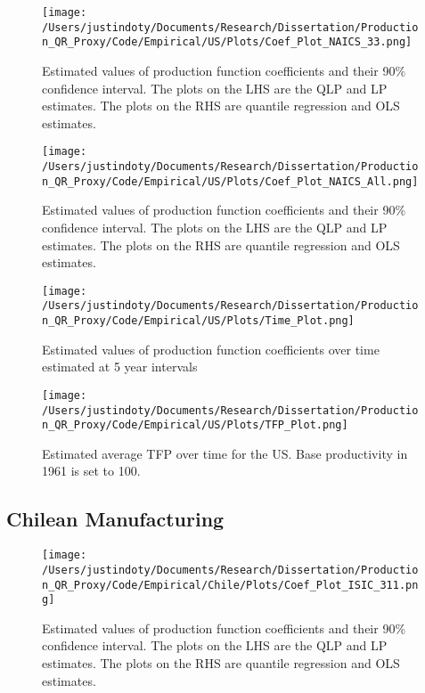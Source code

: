 \documentclass[11pt]{article}
\begin{document}
\begin{figure}[H]
\centering
\texttt{[image: /Users/justindoty/Documents/Research/Dissertation/Production\_QR\_Proxy/Code/Empirical/US/Plots/Coef\_Plot\_NAICS\_33.png]}
\caption{Estimated values of production function coefficients and their 90\% confidence interval. The plots on the LHS are the QLP and LP estimates. The plots on the RHS are quantile regression and OLS estimates.}
\end{figure}

\begin{figure}[H]
\centering
\texttt{[image: /Users/justindoty/Documents/Research/Dissertation/Production\_QR\_Proxy/Code/Empirical/US/Plots/Coef\_Plot\_NAICS\_All.png]}
\caption{Estimated values of production function coefficients and their 90\% confidence interval. The plots on the LHS are the QLP and LP estimates. The plots on the RHS are quantile regression and OLS estimates.}
\end{figure}

\begin{figure}[H]
\centering
\texttt{[image: /Users/justindoty/Documents/Research/Dissertation/Production\_QR\_Proxy/Code/Empirical/US/Plots/Time\_Plot.png]}
\caption{Estimated values of production function coefficients over time estimated at 5 year intervals}
\end{figure}

\begin{figure}[H]
\centering
\texttt{[image: /Users/justindoty/Documents/Research/Dissertation/Production\_QR\_Proxy/Code/Empirical/US/Plots/TFP\_Plot.png]}
\caption{Estimated average TFP over time for the US. Base productivity in 1961 is set to 100.}
\end{figure}


\subsection{Chilean Manufacturing}




\begin{figure}[H]
\centering
\texttt{[image: /Users/justindoty/Documents/Research/Dissertation/Production\_QR\_Proxy/Code/Empirical/Chile/Plots/Coef\_Plot\_ISIC\_311.png]}
\caption{Estimated values of production function coefficients and their 90\% confidence interval. The plots on the LHS are the QLP and LP estimates. The plots on the RHS are quantile regression and OLS estimates.}
\end{figure}
\end{document}
